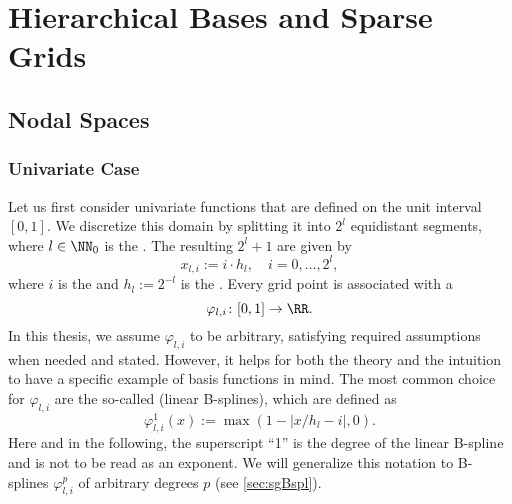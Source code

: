 \section{Hierarchical Bases and Sparse Grids}




\subsection{Nodal Spaces}


\subsubsection{Univariate Case}

Let us first consider univariate functions
that are defined on the unit interval $[0, 1]$.
%
We discretize this domain by splitting it into $2^l$ equidistant segments,
where $l \in \NN_0$ is the .
%
%
%
The resulting $2^l + 1$  are given by
\begin{equation}
  x_{l,i} := i \cdot h_l,\quad
  i = 0, \dotsc, 2^l,
\end{equation}
where $i$ is the  and $h_l := 2^{-l}$ is the .
%
Every grid point is associated with a 
\begin{equation}
  \varphi_{l,i}\colon [0, 1] \to \RR.
\end{equation}
In this thesis, we assume $\varphi_{l,i}$ to be arbitrary,
satisfying required assumptions when needed and stated.
However, it helps for both the theory and the intuition to have a
specific example of basis functions in mind.
%
The most common choice for $\varphi_{l,i}$ are the so-called 
(linear B-splines), which are defined as
\begin{equation}
  \varphi_{l,i}^1(x)
  := \max(1 - |x/h_l - i|, 0).
\end{equation}
Here and in the following,
the superscript ``1'' is the degree of the linear B-spline and
is not to be read as an exponent.
We will generalize this notation to B-splines $\varphi_{l,i}^p$ of
arbitrary degrees $p$ (see \cref{sec:sgBspl}).

